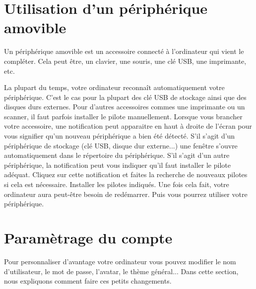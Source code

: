 \documentclass[12pt]{book}
\begin{document}
\section{Utilisation d'un périphérique amovible}
	Un périphérique amovible est un accessoire connecté à l'ordinateur qui vient le compléter.
	Cela peut être, un clavier, une souris, une clé USB, une imprimante, etc.\par
	La plupart du temps, votre ordinateur reconnaît automatiquement votre périphérique.
	C'est le cas pour la plupart des clé USB de stockage ainsi que des disques durs externes.
	Pour d'autres accessoires commes une imprimante ou un scanner, il faut parfois installer le pilote manuellement.
	Lorsque vous brancher votre accessoire, une notification peut apparaitre en haut à droite de l'écran pour vous signifier qu'un nouveau périphérique a bien été détecté.
	S'il s'agit d'un périphérique de stockage (clé USB, disque dur externe...) une fenêtre s'ouvre automatiquement dans le répertoire du périphérique.
	S'il s'agit d'un autre périphérique, la notification peut vous indiquer qu'il faut installer le pilote adéquat.
	Cliquez sur cette notification et faites la recherche de nouveaux pilotes si cela est nécessaire.
	Installer les pilotes indiqués.
	Une fois cela fait, votre ordinateur aura peut-être besoin de redémarrer.
	Puis vous pourrez utiliser votre périphérique.
\section{Paramètrage du compte}
	Pour personnaliser d'avantage votre ordinateur vous pouvez modifier le nom d'utilisateur, le mot de passe, l'avatar, le thème général...
	Dans cette section, nous expliquons comment faire ces petits changements.
\end{document}
